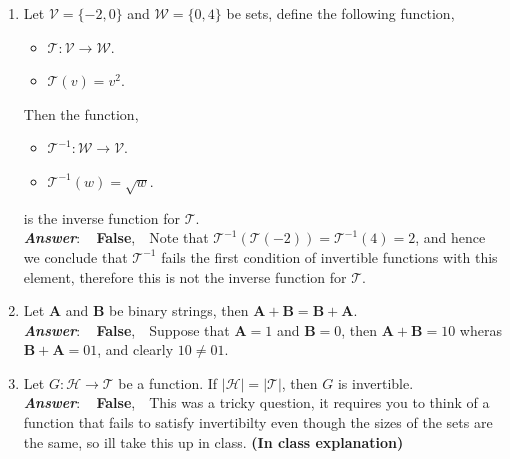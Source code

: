 \documentclass[12pt]{article} %
\begin{document}
\begin{qstn}[1][(8 points)]
\begin{enumerate}
   \item Let $ \mathcal{V} = \{-2,0\} $ and $ \mathcal{W} = \{0,4\} $ be sets, 
              define the following function, 
              \begin{itemize}
                \item $\mathcal{T} \colon \mathcal{V} \to \mathcal{W}$.
                \item $\mathcal{T}(v) = v^2$.
              \end{itemize}
              Then the function,
              \begin{itemize}
                \item $\mathcal{T}^{-1} \colon \mathcal{W} \to \mathcal{V}$.
                \item $\mathcal{T}^{-1}(w) = \sqrt{w}$.
              \end{itemize}
              is the inverse function for $\mathcal{T}$.\\
      \textbf{\emph{Answer}}: \,\,\, \textbf{False}, \,\, Note that $\mathcal{T}^{-1}(\mathcal{T}(-2)) =
      \mathcal{T}^{-1}(4) = 2$, and hence we conclude that $\mathcal{T}^{-1}$ fails the first condition of
      invertible functions with this element, therefore this is not the inverse function for $\mathcal{T}$.\\

    \newpage

   \item Let $\textbf{A}$ and $\textbf{B}$ be binary strings, then $\textbf{A} + \textbf{B} = \textbf{B} +
        \textbf{A}$.\\
      \textbf{\emph{Answer}}: \,\,\, \textbf{False}, \,\, Suppose that $\textbf{A} = 1$ and $\textbf{B} = 0$, then
      $\textbf{A} + \textbf{B} = 10$ wheras $\textbf{B} + \textbf{A} = 01$, and clearly $10 \neq 01$.\\

    \item Let $G \colon \mathcal{H} \to \mathcal{T}$ be a function. If 
      $\left|\mathcal{H}\right| = \left|\mathcal{T}\right|$, then $G$ is invertible.\\
      \textbf{\emph{Answer}}: \,\,\, \textbf{False}, \,\, This was a tricky question, it requires you to think of a
      function that fails to satisfy invertibilty even though the sizes of the sets are the same, so ill take this
      up in class. \textbf{(In class explanation)}\\

  \end{enumerate}
\end{qstn}
\end{document}
